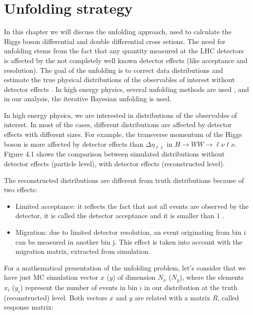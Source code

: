\section{Unfolding strategy}
\label{unfolding}


In this chapter we will discuss the unfolding approach, used to calculate the Higgs boson differential and double differential cross setions. The need for unfolding stems from the fact that any quantity measured at the LHC detectors is affected by the not completely well known detector effects (like acceptance and resolution). The goal of the unfolding is to correct data distributions and estimate the true physical distributions of the observables of interest without detector effects \cite{ATLAS2021zxb}. In high energy physics, several unfolding methods are used \cite{blobel2002unfolding}, and in our analysis, the iterative Bayesian unfolding \cite{dagostini2010improved} is used.

In high energy physics, we are interested in distributions of the observables of interest. In most of the cases, different distributions are affected by detector effects with different sizes. For example, the transverse momentum of the Higgs boson is more affected by detector effects than $\Delta \eta_{\ell \ell}$ in $H \rightarrow WW \rightarrow \ell \nu \ell \nu$. Figure 4.1 shows the comparison between simulated distributions without detector effects (particle level), with detector effects (reconstructed level).

The reconstructed distributions are different from truth distributions because of two effects:
\begin{itemize}
  \item Limited acceptance: it reflects the fact that not all events are observed by the detector, it is called the detector acceptance and it is smaller than 1 \cite{MONK201317}.
  \item Migration:  due to limited detector resolution, an event originating from bin i can be measured in another bin j. This effect is taken into account with the migration matrix, extracted from simulation.
\end{itemize}

For a mathematical presentation of the unfolding problem, let’s consider that we have just MC simulation vector $x$ ($y$) of dimension $N_{x}$ ($N_{y}$), where the elements $x_{i}$ ($y_{i}$) represent the number of events in bin $i$ in our distribution at the truth (reconstructed) level. Both vectors $x$ and $y$ are related with a matrix $R$, called response matrix:

